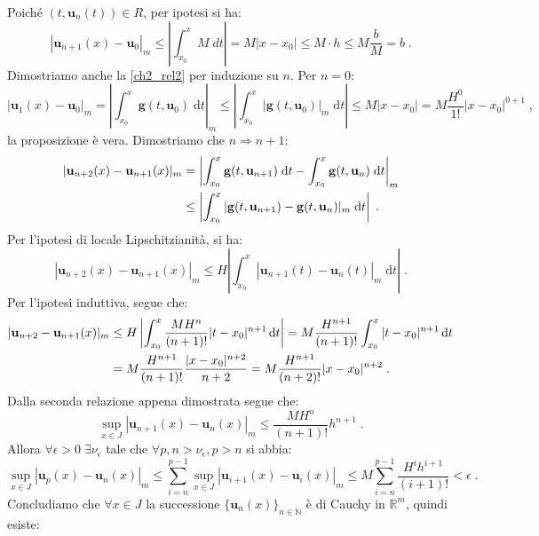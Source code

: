 \documentclass[a4paper,12pt]{report}
\theoremstyle{plain}
\theoremstyle{definition}
\theoremstyle{remark}
\newcommand{\diff}[1]{\mathrm{d}#1}
\numberwithin{equation}{section}
\begin{document}
Poiché $(t,\mathbf{u}_n(t))\in R$, per ipotesi si ha:
\begin{equation}
|\mathbf{u}_{n+1}(x)-\mathbf{u}_0|_m \le \left| \int_{x_0}^x M\;dt \right|=M|x-x_0|\le M\cdot h \le M \frac{b}{M}=b\;.
\end{equation}
Dimostriamo anche la \eqref{ch2_rel2} per induzione su $n$. Per $n=0$:
\begin{equation}
|\mathbf{u}_1(x)-\mathbf{u}_0|_m = \left| \int_{x_0}^x \mathbf{g}(t,\mathbf{u}_0)\;\diff{t}\right|_m \le \left| \int_{x_0}^x |\mathbf{g}(t,
\mathbf{u}_0)|_m\;\diff{t}\right| \le M|x-x_0|=M\frac{H^0}{1!}|x-x_0|^{0+1}\;,
\end{equation}
la proposizione è vera. Dimostriamo che $n \Longrightarrow n+1$:
\begin{align}
|\mathbf{u}_{n+2}(x)-\mathbf{u}_{n+1}(x)|_m &= \left|\int_{x_0}^x\mathbf{g}(t,\mathbf{u}_{n+1})\;\diff{t}-\int_{x_0}^x\mathbf{g}(t,\mathbf{u}_n)\;\diff{t}\right|_m \notag \\
&\le \left|\int_{x_0}^x|\mathbf{g}(t,\mathbf{u}_{n+1})-\mathbf{g}(t,\mathbf{u}_n)|_m\;\diff{t}\right|\;.
\end{align}
Per l'ipotesi di locale Lipschitzianità, si ha:
\begin{equation}
|\mathbf{u}_{n+2}(x)-\mathbf{u}_{n+1}(x)|_m \le H \left|\int_{x_0}^x |\mathbf{u}_{n+1}(t)-\mathbf{u}_n(t)|_m\;\diff{t}\right|\;.
\end{equation}
Per l'ipotesi induttiva, segue che:
\begin{align}
|\mathbf{u}_{n+2}-\mathbf{u}_{n+1}(x)|_m &\le H\left|\int_{x_0}^x\frac{MH^n}{(n+1)!}|t-x_0|^{n+1}\,\diff{t}\right|=M\frac{H^{n+1}}{(n+1)!}\int_{x_0}^x|t-x_0|^{n+1}\,\diff{t} \notag \\
&= M\frac{H^{n+1}}{(n+1)!}\frac{|x-x_0|^{n+2}}{n+2}=M\frac{H^{n+1}}{(n+2)!}|x-x_0|^{n+2}\;.
\end{align}
Dalla seconda relazione appena dimostrata segue che:
\begin{equation}
\sup_{x \in J} |\mathbf{u}_{n+1}(x)-\mathbf{u}_n(x)|_m \le \frac{MH^n}{(n+1)!}h^{n+1}\;.
\end{equation}
Allora $\forall \epsilon>0\; \exists \nu_{\epsilon}$ tale che $\forall p,n>\nu_{\epsilon}, p>n$ si abbia:
\begin{equation}
\sup_{x \in J} |\mathbf{u}_p(x)-\mathbf{u}_n(x)|_m \le \sum_{i=n}^{p-1} \sup_{x \in J} |\mathbf{u}_{i+1}(x)-\mathbf{u}_i(x)|_m
\le M \sum_{i=n}^{p-1} \frac{H^i h^{i+1}}{(i+1)!} < \epsilon\;.
\end{equation}
Concludiamo che $\forall x \in J$ la successione $\{ \mathbf{u}_n(x)\}_{n \in \mathbb{N}}$ è di Cauchy in $\mathbb{R}^m$, quindi esiste:
\end{document}
